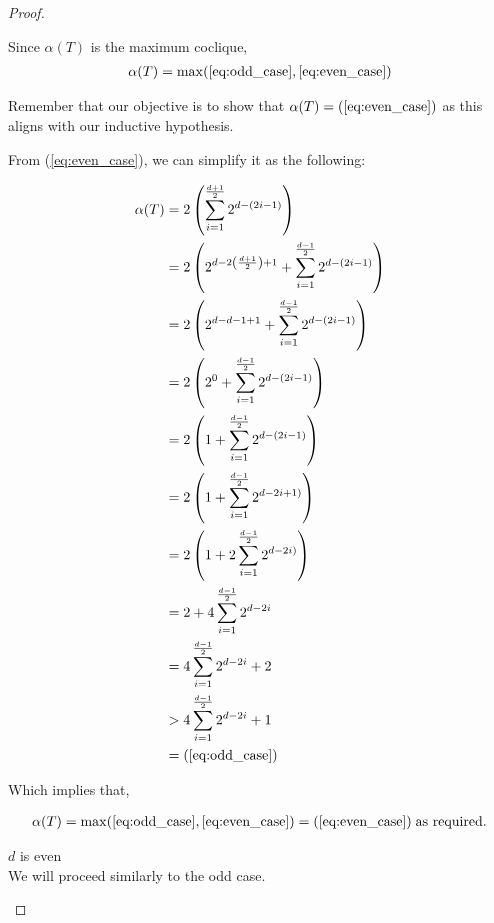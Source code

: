 \documentclass{amsart}
\theoremstyle{definition}
\begin{document}
\begin{proof}
\begin{caseof}
\begin{subcaseof}
		\end{subcaseof}

		Since $\alpha(T)$ is the maximum coclique,
		\begin{align*}
			\alpha(T) = \max(\ref{eq:odd_case}, \ref{eq:even_case})
		\end{align*}

		Remember that our objective is to show that $\alpha(T) = (\ref{eq:even_case})$ as this aligns with our inductive hypothesis.

		From (\ref{eq:even_case}), we can simplify it as the following:

		\begin{align*}
			\alpha(T) & = 2\left(\displaystyle\sum_{i = 1}^{\frac{d + 1}{2}}2^{d - (2i - 1)}\right)  \\
				  & = 2\left(2^{d - 2\left(\frac{d + 1}{2}\right) + 1} + \displaystyle\sum_{i = 1}^{\frac{d - 1}{2}}2^{d - (2i - 1)}\right)\\
				  & = 2\left(2^{d - d - 1 + 1} + \displaystyle\sum_{i = 1}^{\frac{d - 1}{2}}2^{d - (2i - 1)}\right)\\
				  & = 2\left(2^0 + \displaystyle\sum_{i = 1}^{\frac{d - 1}{2}}2^{d - (2i - 1)}\right)\\
				  & = 2\left(1 + \displaystyle\sum_{i = 1}^{\frac{d - 1}{2}}2^{d - (2i - 1)}\right)\\
				  & = 2\left(1 + \displaystyle\sum_{i = 1}^{\frac{d - 1}{2}}2^{d - 2i + 1)}\right)\\
				  & = 2\left(1 + 2\displaystyle\sum_{i = 1}^{\frac{d - 1}{2}}2^{d - 2i)}\right)\\
				  & = 2 + 4\displaystyle\sum_{i = 1}^{\frac{d - 1}{2}}2^{d - 2i}\\
				  & = 4\displaystyle\sum_{i = 1}^{\frac{d - 1}{2}}2^{d - 2i} + 2 \\
				  & > 4\displaystyle\sum_{i = 1}^{\frac{d - 1}{2}}2^{d - 2i} + 1 \\
				  & = (\ref{eq:odd_case})
		\end{align*}

		Which implies that,

		\begin{align*}
			\alpha(T) = \max(\ref{eq:odd_case}, \ref{eq:even_case}) = (\ref{eq:even_case})\; \text{as required.}
		\end{align*}

	\item $d$ is even \\

		We will proceed similarly to the odd case.


\end{caseof}
\end{proof}
\end{document}
